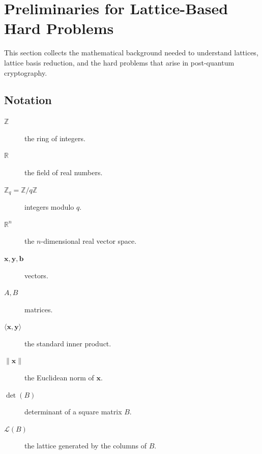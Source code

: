 \newpage
\section{Preliminaries for Lattice-Based Hard Problems}
This section collects the mathematical background needed to understand lattices, lattice basis reduction, and the hard problems that arise in post-quantum cryptography. 


\subsection{Notation}
\begin{description}
	\item[\(\mathbb{Z}\)] the ring of integers.
	\item[\(\mathbb{R}\)] the field of real numbers.
	\item[\(\mathbb{Z}_q = \mathbb{Z}/q\mathbb{Z}\)] integers modulo \(q\).
	\item[\(\mathbb{R}^n\)] the \(n\)-dimensional real vector space.
	\item[\(\mathbf{x},\mathbf{y},\mathbf{b}\)] vectors.
	\item[\(A,B\)] matrices.
	\item[\(\langle \mathbf{x},\mathbf{y}\rangle\)] the standard inner product.
	\item[\(\|\mathbf{x}\|\)] the Euclidean norm of \(\mathbf{x}\).
	\item[\(\det(B)\)] determinant of a square matrix \(B\).
	\item[\(\mathcal{L}(B)\)] the lattice generated by the columns of \(B\).
\end{description}

